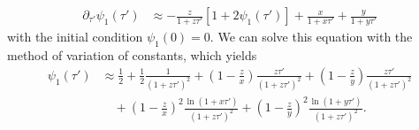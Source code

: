 \documentclass[aps,rmp,twocolumn,groupedaddress,floatfix,notitlepage]{revtex4-1}
\begin{document}
\begin{align}\label{eq:z_neutral_eq}
    \partial_{\tau'}\psi_1(\tau') &\approx - \frac{z}{1+z\tau'}\left[1+2\psi_1(\tau')\right] + \frac{x}{1+x\tau'} + \frac{y}{1+y\tau'}
\end{align}
with the initial condition $\psi_1(0)=0$. We can solve this equation with the method of variation of constants, which yields
\begin{align}\label{eq:\psi_1}
    \psi_1(\tau') &\approx \frac{1}{2} 
    + \frac{1}{2}\frac{1}{(1+z\tau')^2} + \left(1-\frac{z}{x}\right)\frac{z\tau'}{(1+z\tau')^2} + \left(1-\frac{z}{y}\right)\frac{z\tau'}{(1+z\tau')^2}
         \\\nonumber
    &\quad + \left(1-\frac{z}{x}\right)^2 \frac{\ln(1+x\tau')}{(1+z\tau')^2}
    + \left(1-\frac{z}{y}\right)^2 \frac{\ln(1+y\tau')}{(1+z\tau')^2}.
\end{align}
\end{document}
